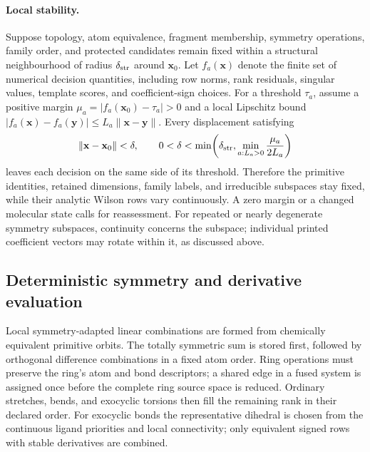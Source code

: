 \documentclass[10pt]{article}
\begin{document}
\paragraph{Local stability.}
{Suppose topology, atom equivalence, fragment membership,
symmetry operations, family order, and protected candidates remain fixed
within a structural neighbourhood of radius \(\delta_{\rm str}\) around
\(\mathbf x_0\). Let \(f_a(\mathbf x)\) denote the finite set of numerical
decision quantities, including row norms, rank residuals, singular values,
template scores, and coefficient-sign choices. For a threshold \(\tau_a\),
assume a positive margin
\(\mu_a=|f_a(\mathbf x_0)-\tau_a|>0\) and a local Lipschitz bound
\(|f_a(\mathbf x)-f_a(\mathbf y)|\leq L_a\|\mathbf x-\mathbf y\|\).
Every displacement satisfying}
\begin{equation}
 {\|\mathbf x-\mathbf x_0\|<\delta,
 \qquad 0<\delta<\min\!\left(
 \delta_{\rm str},\min_{a:L_a>0}\frac{\mu_a}{2L_a}\right)}
 \label{eq:si-local-stability}
\end{equation}
{leaves each decision on the same side of its threshold.
Therefore the primitive identities, retained dimensions, family labels, and
irreducible subspaces stay fixed, while their analytic Wilson rows vary
continuously. A zero margin or a changed molecular state calls for reassessment.
For repeated or nearly degenerate symmetry
subspaces, continuity concerns the subspace; individual printed coefficient
vectors may rotate within it, as discussed above.}

\subsection{Deterministic symmetry and derivative evaluation}

{Local symmetry-adapted linear combinations are formed from
chemically equivalent primitive orbits. The totally symmetric sum is stored
first, followed by orthogonal difference combinations in a fixed atom order.
Ring operations must preserve the ring's atom and bond descriptors; a shared
edge in a fused system is assigned once before the complete ring source space
is reduced. Ordinary stretches, bends, and exocyclic torsions then fill the
remaining rank in their declared order. For exocyclic bonds the representative
dihedral is chosen from the continuous ligand priorities and local
connectivity; only equivalent signed rows with stable derivatives are combined.}
\end{document}
